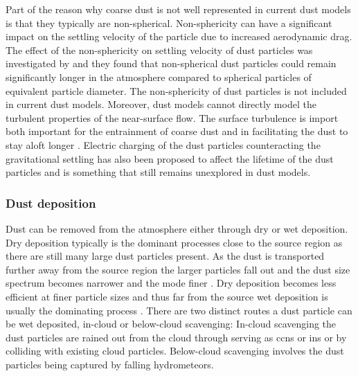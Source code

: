 Part of the reason why coarse dust is not well represented in current dust models is that they typically are non-spherical. Non-sphericity can have a significant impact on the settling velocity of the particle due to increased aerodynamic drag. The effect of the non-sphericity on settling velocity of dust particles was investigated by \textcite{mallios2020effects} and they found that non-spherical dust particles could remain significantly longer in the atmosphere compared to spherical particles of equivalent particle diameter. The non-sphericity of dust particles is not included in current dust models. Moreover, dust models cannot directly model the turbulent properties of the near-surface flow. The surface turbulence is import both important for the entrainment of coarse dust \parencite{klose2013large} and in facilitating the dust to stay aloft longer \parencite{ryder2013impact}. Electric charging of the dust particles counteracting the gravitational settling has also been proposed to affect the lifetime of the dust particles and is something that still remains unexplored in dust models.     

\subsubsection{Dust deposition}
Dust can be removed from the atmosphere either through dry or wet deposition. Dry deposition typically is the dominant processes close to the source region as there are still many large dust particles present. As the dust is transported further away from the source region the larger particles fall out and the dust size spectrum becomes narrower and the mode finer \parencite{does2016particle}. Dry deposition becomes less efficient at finer particle sizes and thus far from the source wet deposition is usually the dominating process . There are two distinct routes a dust particle can be wet deposited, in-cloud or below-cloud scavenging: In-cloud scavenging the dust particles are rained out from the cloud through serving as \acrshort{ccn}s or \acrshort{in}s or by colliding with existing cloud particles. Below-cloud scavenging involves the dust particles being captured by falling hydrometeors. 

